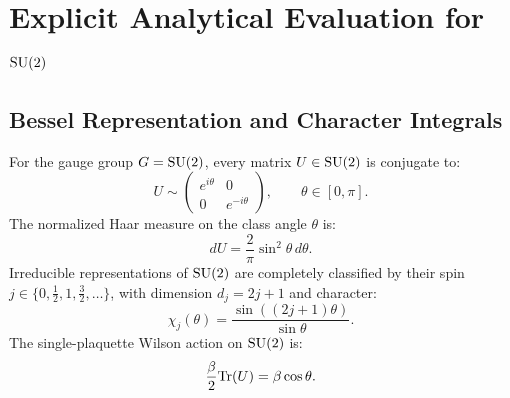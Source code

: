 \section{Explicit Analytical Evaluation for \texorpdfstring{$\mathrm{SU}(2)$}{SU(2)}}
\label{sec:explicit_su2}

\subsection{Bessel Representation and Character Integrals}
\label{subsec:su2_bessel_formulas}

For the gauge group $G = \mathrm{SU}(2)$, every matrix $U \in \mathrm{SU}(2)$ is conjugate to:
\begin{equation}
U \sim \begin{pmatrix} e^{i\theta} & 0 \\ 0 & e^{-i\theta} \end{pmatrix}, \qquad \theta \in [0, \pi].
\end{equation}
The normalized Haar measure on the class angle $\theta$ is:
\begin{equation}
\label{eq:su2_haar_measure_theta}
dU = \frac{2}{\pi} \sin^2\theta \, d\theta.
\end{equation}
Irreducible representations of $\mathrm{SU}(2)$ are completely classified by their spin $j \in \{0, \frac{1}{2}, 1, \frac{3}{2}, \dots\}$, with dimension $d_j = 2j + 1$ and character:
\begin{equation}
\label{eq:su2_spin_j_character}
\chi_j(\theta) = \frac{\sin((2j+1)\theta)}{\sin\theta}.
\end{equation}
The single-plaquette Wilson action on $\mathrm{SU}(2)$ is:
\begin{equation}
\frac{\beta}{2} \mathrm{Tr}(U) = \beta \cos\theta.
\end{equation}

